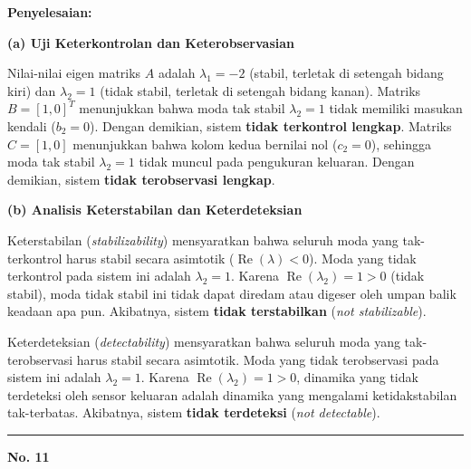 \documentclass[11pt,a4paper]{article}
\begin{document}
\textbf{Penyelesaian:}

\textbf{(a) Uji Keterkontrolan dan Keterobservasian}

Nilai-nilai eigen matriks $A$ adalah $\lambda_1 = -2$ (stabil, terletak di setengah bidang kiri) dan $\lambda_2 = 1$ (tidak stabil, terletak di setengah bidang kanan).
Matriks $B = [1, 0]^T$ menunjukkan bahwa moda tak stabil $\lambda_2 = 1$ tidak memiliki masukan kendali ($b_2 = 0$). Dengan demikian, sistem \textbf{tidak terkontrol lengkap}.
Matriks $C = [1, 0]$ menunjukkan bahwa kolom kedua bernilai nol ($c_2 = 0$), sehingga moda tak stabil $\lambda_2 = 1$ tidak muncul pada pengukuran keluaran. Dengan demikian, sistem \textbf{tidak terobservasi lengkap}.

\textbf{(b) Analisis Keterstabilan dan Keterdeteksian}

Keterstabilan (\textit{stabilizability}) mensyaratkan bahwa seluruh moda yang tak-terkontrol harus stabil secara asimtotik ($\operatorname{Re}(\lambda) < 0$).
Moda yang tidak terkontrol pada sistem ini adalah $\lambda_2 = 1$. Karena $\operatorname{Re}(\lambda_2) = 1 > 0$ (tidak stabil), moda tidak stabil ini tidak dapat diredam atau digeser oleh umpan balik keadaan apa pun. Akibatnya, sistem \textbf{tidak terstabilkan} (\textit{not stabilizable}).

Keterdeteksian (\textit{detectability}) mensyaratkan bahwa seluruh moda yang tak-terobservasi harus stabil secara asimtotik.
Moda yang tidak terobservasi pada sistem ini adalah $\lambda_2 = 1$. Karena $\operatorname{Re}(\lambda_2) = 1 > 0$, dinamika yang tidak terdeteksi oleh sensor keluaran adalah dinamika yang mengalami ketidakstabilan tak-terbatas. Akibatnya, sistem \textbf{tidak terdeteksi} (\textit{not detectable}).

\vspace{12pt}
\hrule
\vspace{10pt}

\textbf{\large No. 11}
\end{document}
